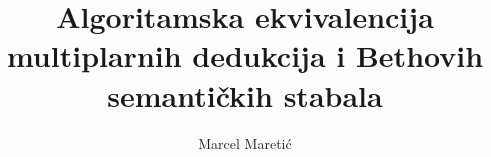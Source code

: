 \documentclass[
serif,
t,%
compress,%
notheorems,
ams style,
]{beamer}
\title{Algoritamska ekvivalencija multiplarnih dedukcija i Bethovih semantičkih stabala}%
\author{Marcel Maretić}
\begin{document}
      \begin{frame}[plain]{}
      \maketitle
      \end{frame}

      \begin{frame}
       \tableofcontents 
      \end{frame}





\end{document}
